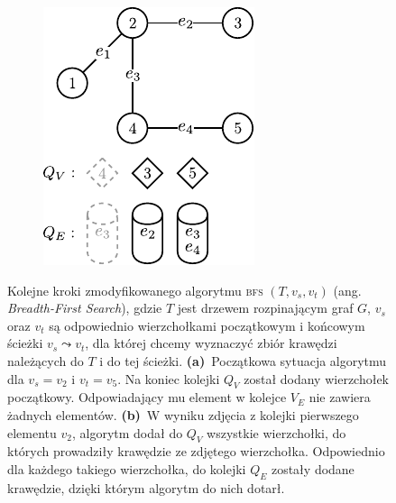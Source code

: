 \begin{savenotes}
\begin{figure}[!h]
\begin{subfigure}[b]{0.24\textwidth}
			\caption{}
			\label{fig:bfsExample:c}
		\end{subfigure}
		\hfill
		\begin{subfigure}[b]{0.24\textwidth}
			\includegraphics[width=\textwidth]{Chapter_V/BFS-example/d}
			\caption{}
			\label{fig:bfsExample:d}
		\end{subfigure}
		\hfill\null
		\caption[Kolejne kroki zmodyfikowanego algorytmu \textsc{bfs} $\left( T, v_{s}, v_{t} \right)$]{
			Kolejne kroki zmodyfikowanego algorytmu \textsc{bfs} $\left( T, v_{s}, v_{t} \right)$ (ang. \textit{Breadth-First Search}), gdzie $T$ jest drzewem rozpinającym graf $G$, $v_{s}$ oraz $v_{t}$ są odpowiednio wierzchołkami początkowym i końcowym ścieżki $v_{s} \leadsto v_{t}$, dla której chcemy wyznaczyć zbiór krawędzi należących do $T$ i do tej ścieżki.
			\textbf{(a)}~Początkowa sytuacja algorytmu dla $v_{s} = v_{2}$ i $v_{t} = v_{5}$. Na koniec kolejki $Q_{V}$ został dodany wierzchołek początkowy. Odpowiadający mu element w kolejce $V_{E}$ nie zawiera żadnych elementów.
			\textbf{(b)}~W wyniku zdjęcia z kolejki pierwszego elementu $v_{2}$, algorytm dodał do $Q_{V}$ wszystkie wierzchołki, do których prowadziły krawędzie ze zdjętego wierzchołka. Odpowiednio dla każdego takiego wierzchołka, do kolejki $Q_{E}$ zostały dodane krawędzie, dzięki którym algorytm do nich dotarł.
}
\end{figure}
\end{savenotes}
